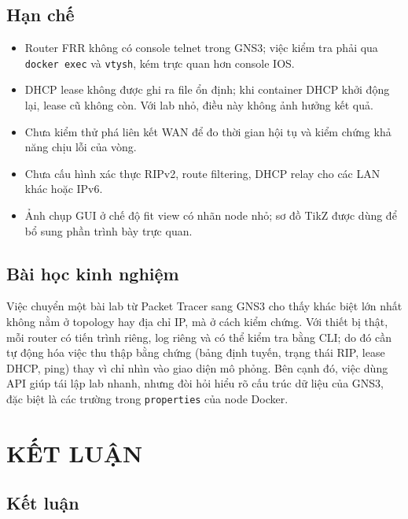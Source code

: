 \documentclass[12pt,a4paper]{article}
\begin{document}
\subsection{Hạn chế}

\begin{itemize}[leftmargin=1.6em,itemsep=2pt]
  \item Router FRR không có console telnet trong GNS3; việc kiểm tra phải qua
        \texttt{docker exec} và \texttt{vtysh}, kém trực quan hơn console IOS.
  \item DHCP lease không được ghi ra file ổn định; khi container DHCP khởi động lại, lease cũ
        không còn. Với lab nhỏ, điều này không ảnh hưởng kết quả.
  \item Chưa kiểm thử phá liên kết WAN để đo thời gian hội tụ và kiểm chứng khả năng chịu lỗi
        của vòng.
  \item Chưa cấu hình xác thực RIPv2, route filtering, DHCP relay cho các LAN khác hoặc IPv6.
  \item Ảnh chụp GUI ở chế độ fit view có nhãn node nhỏ; sơ đồ TikZ được dùng để bổ sung phần
        trình bày trực quan.
\end{itemize}

\subsection{Bài học kinh nghiệm}

Việc chuyển một bài lab từ Packet Tracer sang GNS3 cho thấy khác biệt lớn nhất không nằm ở
topology hay địa chỉ IP, mà ở cách kiểm chứng. Với thiết bị thật, mỗi router có tiến trình riêng,
log riêng và có thể kiểm tra bằng CLI; do đó cần tự động hóa việc thu thập bằng chứng (bảng định
tuyến, trạng thái RIP, lease DHCP, ping) thay vì chỉ nhìn vào giao diện mô phỏng. Bên cạnh đó,
việc dùng API giúp tái lập lab nhanh, nhưng đòi hỏi hiểu rõ cấu trúc dữ liệu của GNS3, đặc biệt
là các trường trong \texttt{properties} của node Docker.

\section{KẾT LUẬN}

\subsection{Kết luận}
\end{document}
